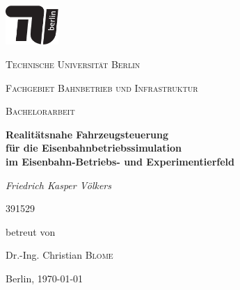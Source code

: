 \newpage
\centering
\includegraphics[width=0.15\textwidth]{../images/tu_Logo/TU_Logo_kurz_1c_schwarz.pdf}\par\vspace{1cm}
{\scshape\LARGE Technische Universität Berlin\par}
\vspace{0cm}
{\scshape\normalsize Fachgebiet Bahnbetrieb und Infrastruktur\par}
\vspace{1cm}
{\scshape\LARGE Bachelorarbeit\par}
\vspace{1.5cm}
{\LARGE\bfseries Realitätsnahe Fahrzeugsteuerung\\für die Eisenbahnbetriebssimulation\\im Eisenbahn-Betriebs- und Experimentierfeld\par}
\vspace{2cm}
{\Large\itshape Friedrich Kasper Völkers\par}
\vspace{0cm}
{\normalsize 391529\par}
\vfill
betreut von\par
Dr.-Ing. Christian \textsc{Blome}
\vfill
{\large Berlin, \today\par}
\justifying
\newpage